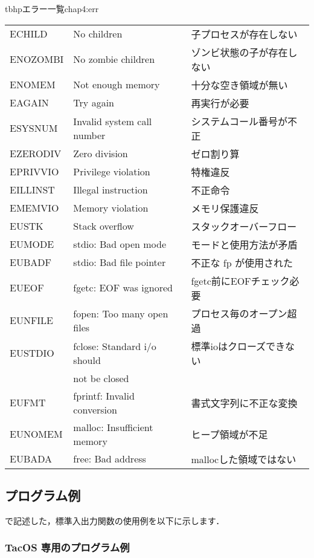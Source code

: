 \begin{mytable}{tbhp}{エラー一覧}{chap4:err}
\begin{tabular}{l|l|l}
ECHILD    & No children                 & 子プロセスが存在しない \\
ENOZOMBI  & No zombie children          & ゾンビ状態の子が存在しない \\
ENOMEM    & Not enough memory           & 十分な空き領域が無い \\
EAGAIN    & Try again                   & 再実行が必要 \\
ESYSNUM   & Invalid system call number  & システムコール番号が不正 \\
EZERODIV  & Zero division               & ゼロ割り算 \\
EPRIVVIO  & Privilege violation         & 特権違反 \\
EILLINST  & Illegal instruction         & 不正命令 \\
EMEMVIO   & Memory violation            & メモリ保護違反 \\
EUSTK     & Stack overflow              & スタックオーバーフロー \\
EUMODE    & stdio: Bad open mode        & モードと使用方法が矛盾 \\
EUBADF    & stdio: Bad file pointer     & 不正な fp が使用された \\
EUEOF     & fgetc: EOF was ignored      & fgetc前にEOFチェック必要 \\
EUNFILE   & fopen: Too many open files  & プロセス毎のオープン超過 \\
EUSTDIO   & fclose: Standard i/o should & 標準ioはクローズできない \\
          &  not be closed              &                          \\
EUFMT     & fprintf: Invalid conversion & 書式文字列に不正な変換 \\
EUNOMEM   & malloc: Insufficient memory & ヒープ領域が不足 \\
EUBADA    & free: Bad address           & mallocした領域ではない \\
\end{tabular}
\end{mytable}

\subsection{プログラム例}

\cmml で記述した，標準入出力関数の使用例を以下に示します．

\subsubsection{TacOS 専用のプログラム例}

